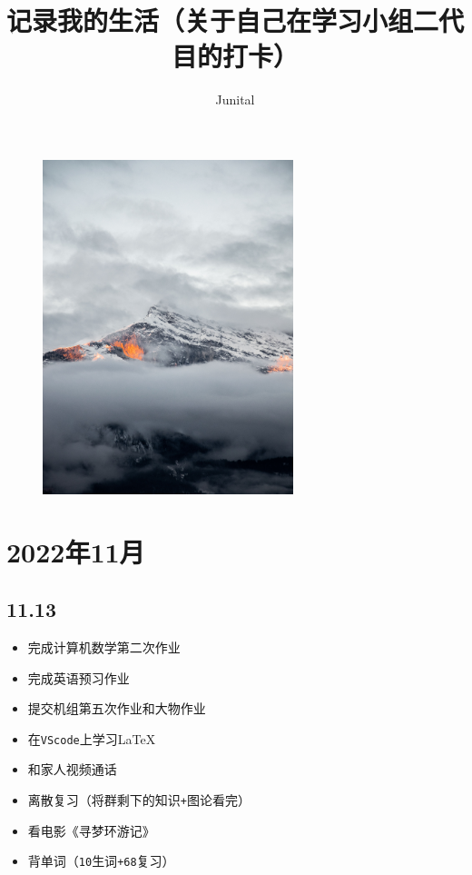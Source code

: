 \documentclass[UTF8]{ctexart}
\title{记录我的生活（关于自己在学习小组二代目的打卡）}
\author{Junital}
\begin{document}
\date{}
\maketitle
\begin{figure}[ht]
    \centering
    \includegraphics[width=0.65\textwidth]{./Figures/nicolas-savignat-wU5sBkxKtXs-unsplash.jpg}
    \nonumber
\end{figure}
\newpage
\section*{2022年11月}
\subsection*{11.13}
\begin{itemize}
    \item 完成计算机数学第二次作业
    \item 完成英语预习作业
    \item 提交机组第五次作业和大物作业
    \item 在\verb|VScode|上学习\LaTeX
    \item 和家人视频通话
    \item 离散复习（将群剩下的知识\verb|+|图论看完）
    \item 看电影《寻梦环游记》
    \item 背单词（\verb|10|生词\verb|+68|复习）
\end{itemize}
\end{document}
